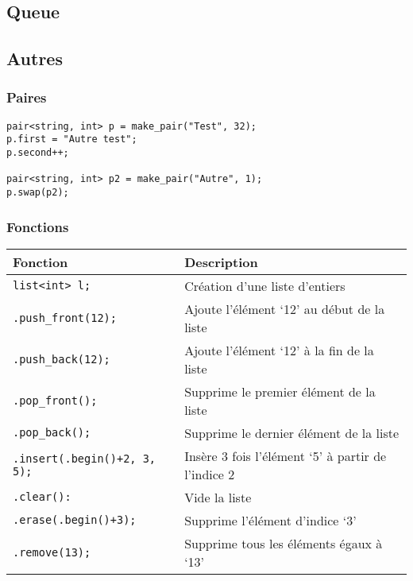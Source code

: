 \documentclass[10pt,a4paper,french]{article}
\begin{document}

\subsection{Queue}


\subsection{Autres}

\subsubsection{Paires}

\begin{verbatim}
pair<string, int> p = make_pair("Test", 32);
p.first = "Autre test";
p.second++;

pair<string, int> p2 = make_pair("Autre", 1);
p.swap(p2);
\end{verbatim}

\subsubsection{Fonctions}

\begin{tabular}{l|l}
Fonction & Description \\
\hline
\texttt{list<int> l;} & Création d'une liste d'entiers \\
\texttt{.push_front(12);} & Ajoute l'élément `12' au début de la liste \\
\texttt{.push_back(12);} & Ajoute l'élément `12' à la fin de la liste \\
\texttt{.pop_front();} & Supprime le premier élément de la liste \\
\texttt{.pop_back();} & Supprime le dernier élément de la liste \\
\texttt{.insert(.begin()+2, 3, 5);} & Insère 3 fois l'élément `5' à partir de l'indice 2 \\
\texttt{.clear():} & Vide la liste \\
\texttt{.erase(.begin()+3);} & Supprime l'élément d'indice `3' \\
\texttt{.remove(13);} & Supprime tous les éléments égaux à `13' \\
\end{tabular}
\end{document}
